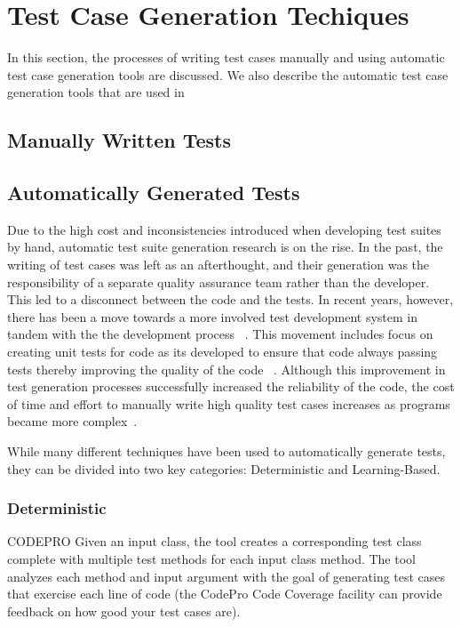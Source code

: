 \section{Test Case Generation Techiques}
\label{sec:background}
In this section, the processes of writing test cases manually and using automatic test case generation tools are discussed.  We also describe the automatic test case generation tools that are used in 

\subsection{Manually Written Tests}


\subsection{Automatically Generated Tests}
Due to the high cost and inconsistencies introduced when developing test suites by hand, automatic test suite generation research is on the rise.  In the past, the writing of test cases was left as an afterthought, and their generation was the responsibility of a separate quality assurance team rather than the developer.  This led to a disconnect between the code and the tests.  In recent years, however, there has been a move towards a more involved test development system in tandem with the the development process ~\cite{Gelperin:1988:GST:62959.62965}.  This movement includes focus on creating unit tests for code as its developed to ensure that code always passing tests thereby improving the quality of the code ~\cite{Canfora:2006:EAT:1159733.1159788}.  Although this improvement in test generation processes successfully increased the reliability of the code, the cost of time and effort to manually write high quality test cases increases as programs became more complex~\cite{clarke1998automated}. 

While many different techniques have been used to automatically generate tests, they can be divided into two key categories: Deterministic and Learning-Based.

\subsubsection{Deterministic}

CODEPRO  Given an input class, the tool creates a corresponding test class complete with multiple test methods for each input class method. The tool analyzes each method and input argument with the goal of generating test cases that exercise each line of code (the CodePro Code Coverage facility can provide feedback on how good your test cases are).

